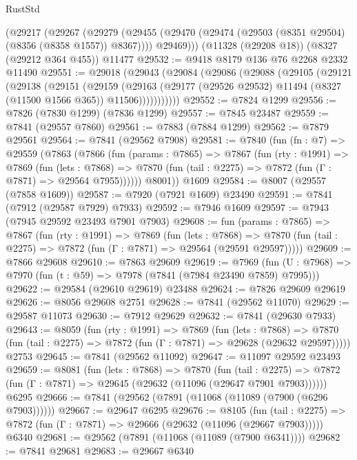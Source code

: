 \begin{lexlean}{RustStd}
\begin{coremodule}
{\begin{coremodule}
{{{{{{{{{{{{{{{{{{{{{{{{{{{{{{{{{{{{{{{{{{{{{{{{{{{{{{    (@29217
      (@29267
        (@29279
          (@29455 (@29470 (@29474 (@29503 (@8351 @29504) (@8356 (@8358 @1557)) @8367))))
          @29469)))
    (@11328 (@29208 @18))
    (@8327 (@29212 @364 @455))
    @11477
@29532 := @9418 @8179 @136 @76 @2268 @2332 @11490
@29551 := @29018
    (@29043
      (@29084
        (@29086
          (@29088
            (@29105
              (@29121
                (@29138
                  (@29151
                    (@29159
                      (@29163
                        (@29177 (@29526 @29532) @11494 (@8327 (@11500 @1566 @365)) @11506)))))))))))
@29552 := @7824 @1299
@29556 := @7826 (@7830 @1299) (@7836 @1299)
@29557 := @7845 @23487
@29559 := @7841 (@29557 @7860)
@29561 := @7883 (@7884 @1299)
@29562 := @7879 @29561
@29564 := @7841 (@29562 @7908)
@29581 := @7840
    (fun (fn : @7) =>
    @29559
      (@7863
        (@7866
          (fun (params : @7865) =>
          @7867
            (fun (rty : @1991) =>
            @7869
              (fun (lets : @7868) =>
              @7870 (fun (tail : @2275) => @7872 (fun (Γ : @7871) => @29564 @7955))))))
        @8001))
    @1609
@29584 := @8007 (@29557 (@7858 @1609))
@29587 := @7920 (@7921 @1609) @23490
@29591 := @7841 (@7912 (@29587 @7929) @7933)
@29592 := @7946 @1609
@29597 := @7943 (@7945 @29592 @23493 @7901 @7903)
@29608 := fun (params : @7865) =>
  @7867
    (fun (rty : @1991) =>
    @7869
      (fun (lets : @7868) =>
      @7870 (fun (tail : @2275) => @7872 (fun (Γ : @7871) => @29564 (@29591 @29597)))))
@29609 := @7866 @29608
@29610 := @7863 @29609
@29619 := @7969
    (fun (U : @7968) => @7970 (fun (t : @59) => @7978 (@7841 (@7984 @23490 @7859) @7995)))
@29622 := @29584 (@29610 @29619) @23488
@29624 := @7826 @29609 @29619
@29626 := @8056 @29608 @2751
@29628 := @7841 (@29562 @11070)
@29629 := @29587 @11073
@29630 := @7912 @29629
@29632 := @7841 (@29630 @7933)
@29643 := @8059
    (fun (rty : @1991) =>
    @7869
      (fun (lets : @7868) =>
      @7870 (fun (tail : @2275) => @7872 (fun (Γ : @7871) => @29628 (@29632 @29597)))))
    @2753
@29645 := @7841 (@29562 @11092)
@29647 := @11097 @29592 @23493
@29659 := @8081
    (fun (lets : @7868) =>
    @7870
      (fun (tail : @2275) =>
      @7872 (fun (Γ : @7871) => @29645 (@29632 (@11096 (@29647 @7901 @7903))))))
    @6295
@29666 := @7841 (@29562 (@7891 (@11068 (@11089 (@7900 (@6296 @7903))))))
@29667 := @29647 @6295
@29676 := @8105
    (fun (tail : @2275) => @7872 (fun (Γ : @7871) => @29666 (@29632 (@11096 (@29667 @7903)))))
    @6340
@29681 := @29562 (@7891 (@11068 (@11089 (@7900 @6341))))
@29682 := @7841 @29681
@29683 := @29667 @6340
}}}}}}}}}}}}}}}}}}}}}}}}}}}}}}}}}}}}}}}}}}}}}}}}}}}}}}
\end{coremodule}}
\end{coremodule}
\end{lexlean}
